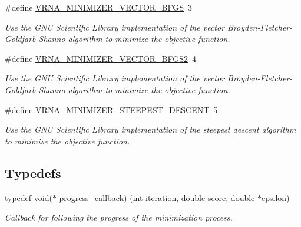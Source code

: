 \begin{DoxyCompactItemize}
\#define \hyperlink{group__perturbation_ga9be8a702cddf58235571ace11cc41b22}{V\+R\+N\+A\+\_\+\+M\+I\+N\+I\+M\+I\+Z\+E\+R\+\_\+\+V\+E\+C\+T\+O\+R\+\_\+\+B\+F\+GS}~3
\begin{DoxyCompactList}\small\item\em Use the G\+NU Scientific Library implementation of the vector Broyden-\/\+Fletcher-\/\+Goldfarb-\/\+Shanno algorithm to minimize the objective function. \end{DoxyCompactList}\item 
\#define \hyperlink{group__perturbation_ga7b0a65c6c92fa1d8012383ba9d3dcb4f}{V\+R\+N\+A\+\_\+\+M\+I\+N\+I\+M\+I\+Z\+E\+R\+\_\+\+V\+E\+C\+T\+O\+R\+\_\+\+B\+F\+G\+S2}~4
\begin{DoxyCompactList}\small\item\em Use the G\+NU Scientific Library implementation of the vector Broyden-\/\+Fletcher-\/\+Goldfarb-\/\+Shanno algorithm to minimize the objective function. \end{DoxyCompactList}\item 
\#define \hyperlink{group__perturbation_ga9ecd2144c2ebed7533233da3986521b0}{V\+R\+N\+A\+\_\+\+M\+I\+N\+I\+M\+I\+Z\+E\+R\+\_\+\+S\+T\+E\+E\+P\+E\+S\+T\+\_\+\+D\+E\+S\+C\+E\+NT}~5
\begin{DoxyCompactList}\small\item\em Use the G\+NU Scientific Library implementation of the steepest descent algorithm to minimize the objective function. \end{DoxyCompactList}\end{DoxyCompactItemize}
\subsection*{Typedefs}
\begin{DoxyCompactItemize}
\item 
typedef void($\ast$ \hyperlink{group__perturbation_gaa715397c7afd2d2955c315512a3d571a}{progress\+\_\+callback}) (int iteration, double score, double $\ast$epsilon)
\begin{DoxyCompactList}\small\item\em Callback for following the progress of the minimization process. \end{DoxyCompactList}\end{DoxyCompactItemize}
